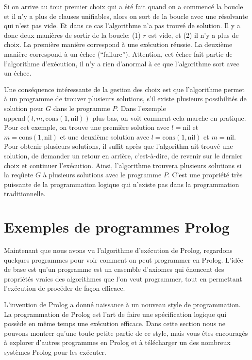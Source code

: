 Si on arrive au tout premier choix qui a été fait quand on a commencé la boucle et il n'y a plus de clauses unifiables,
alors on sort de la boucle avec une résolvante qui n'est pas vide. Et dans ce cas l'algorithme n'a pas trouvé de solution. 
Il y a donc deux manières de sortir de la boucle: (1) $r$ est vide, et (2) il n'y a plus de choix.
La première manière correspond à une exécution réussie.
La deuxième manière correspond à un échec (``failure'').
Attention, cet échec fait partie de l'algorithme d'exécution, il n'y a rien d'anormal à ce que l'algorithme sort avec un échec.

Une conséquence intéressante de la gestion des choix est que
l'algorithme permet à un programme de trouver plusieurs solutions, s'il existe plusieurs possibilités
de solution pour $G$ dans le programme $P$.
Dans l'exemple $\mathrm{append}(l,m,\mathrm{cons}(1,\mathrm{nil}))$ plus bas,
on voit comment cela marche en pratique.
Pour cet exemple, on trouve une première solution avec $l=\mathrm{nil}$ et $m=\mathrm{cons}(1,\mathrm{nil})$ et une deuxième solution
avec $l=\mathrm{cons}(1,\mathrm{nil})$ et $m=\mathrm{nil}$.
Pour obtenir plusieurs solutions, il suffit après que l'algorithm ait trouvé une solution,
de demander un retour en arrière, c'est-à-dire, de revenir sur le dernier choix et continuer l'exécution.
Ainsi, l'algorithme trouvera plusieurs solutions si la reqûete $G$ à plusieurs solutions avec le programme $P$.
C'est une propriété très puissante de la programmation logique qui n'existe pas dans la programmation traditionnelle.


\section{Exemples de programmes Prolog}

Maintenant que nous avons vu l'algorithme d'exécution de Prolog,
regardons quelques programmes pour voir comment on peut programmer en Prolog.
L'idée de base est qu'un programme est un ensemble d'axiomes qui énoncent des propriétés vraies
des algorithmes que l'on veut programmer, tout en permettant l'exécution de procéder de façon efficace.

L'invention de Prolog a donné naissance à un nouveau style de programmation.
La programmation de Prolog est l'art de faire une spécification logique qui possède en même temps une exécution efficace.
Dans cette section nous ne pouvons montrer qu'une toute petite partie de ce style,
mais vous êtes encouragés à explorer d'autres programmes en Prolog et à télécharger
un des nombreux systèmes Prolog pour les exécuter.

